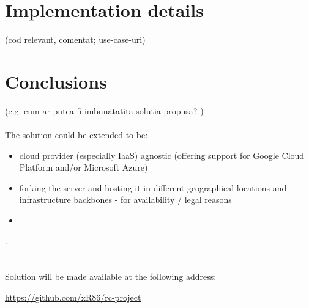 \documentclass{llncs}
\begin{document}
%
\section{Implementation details}
%
(cod relevant, comentat; use-case-uri)
%
\section{Conclusions}
%
(e.g. cum ar putea fi imbunatatita solutia propusa? )\\
\\

The solution could be extended to be: 

\begin{itemize}
  \item cloud provider (especially IaaS) agnostic (offering support for Google Cloud Platform and/or Microsoft Azure)
  \item forking the server and hosting it in different geographical locations and infrastructure backbones - for availability / legal reasons
  \item 
\end{itemize}

.
%
\\
\\
\\
Solution will be made available at the following address:
 \begin{center}\url{https://github.com/xR86/rc-project}\end{center}
\end{document}
